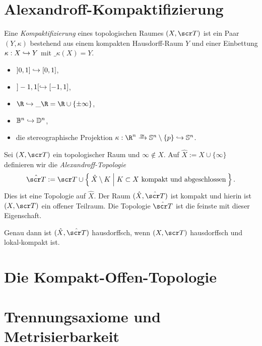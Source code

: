 \section{Alexandroff-Kompaktifizierung}


\begin{df}
	Eine \emph{Kompaktifizierung} eines topologischen Raumes $(X, \scr T)$ ist ein Paar $(Y, \kappa)$ bestehend aus einem kompakten Hausdorff-Raum $Y$ und einer Einbettung $\kappa: X \hookrightarrow Y$ mit $\_{\kappa(X)} = Y$.
\end{df}

\begin{ex}
	\begin{itemize}
		\item
			$]0,1] \hookrightarrow [0,1]$,
		\item
			$]-1,1[ \hookrightarrow [-1,1]$,
		\item
			$\R \injto \_\R = \R \cup \{\pm\infty\}$,
		\item
			$\mathbb{B}^n \hookrightarrow \mathbb{D}^n$,
		\item
			die stereographische Projektion $\kappa: \R^n \homto \S^n \setminus \{p\} \injto \S^n$.
	\end{itemize}
\end{ex}

\begin{st}[Alexandroff]
	Sei $(X, \scr T)$ ein topologischer Raum und $\infty \not\in X$.
	Auf $\hat X := X \cup \{\infty\}$ definieren wir die \emph{Alexandroff-Topologie}
	\[
		\hat{\scr T} :=
		\scr T \cup \Set{ \hat X \setminus K | K \subset X \text{ kompakt und abgeschlossen} }.
	\]
	Dies ist eine Topologie auf $\hat X$.
	Der Raum $(\hat X, \hat{\scr T})$ ist kompakt und hierin ist $(X, \scr T)$ ein offener Teilraum.
	Die Topologie $\hat{\scr T}$ ist die feinste mit dieser Eigenschaft.

	Genau dann ist $(\hat X, \hat{\scr T})$ hausdorffsch, wenn $(X, \scr T)$ hausdorffsch und lokal-kompakt ist.
\end{st}


\section{Die Kompakt-Offen-Topologie}


\section{Trennungsaxiome und Metrisierbarkeit}


